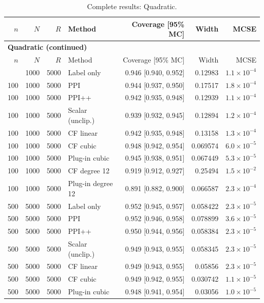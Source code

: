 {\setlength{\tabcolsep}{3pt}\begin{longtable}{rrrlrrr}
\caption{Complete results: Quadratic.}\\
\toprule $n$ & $N$ & $R$ & Method & Coverage [95\% MC] & Width & MCSE \\
\midrule\endfirsthead
\multicolumn{7}{l}{\textbf{Quadratic (continued)}}\\
\toprule $n$ & $N$ & $R$ & Method & Coverage [95\% MC] & Width & MCSE \\
\midrule\endhead
\bottomrule\endfoot
100 & 1000 & 5000 & Label only & 0.946 [0.940, 0.952] & 0.12983 & $1.1\times 10^{-4}$ \\
100 & 1000 & 5000 & PPI & 0.944 [0.937, 0.950] & 0.17517 & $1.8\times 10^{-4}$ \\
100 & 1000 & 5000 & PPI++ & 0.942 [0.935, 0.948] & 0.12939 & $1.1\times 10^{-4}$ \\
100 & 1000 & 5000 & Scalar (unclip.) & 0.939 [0.932, 0.945] & 0.12894 & $1.2\times 10^{-4}$ \\
100 & 1000 & 5000 & CF linear & 0.942 [0.935, 0.948] & 0.13158 & $1.3\times 10^{-4}$ \\
100 & 1000 & 5000 & CF cubic & 0.948 [0.942, 0.954] & 0.069574 & $6.0\times 10^{-5}$ \\
100 & 1000 & 5000 & Plug-in cubic & 0.945 [0.938, 0.951] & 0.067449 & $5.3\times 10^{-5}$ \\
100 & 1000 & 5000 & CF degree 12 & 0.919 [0.912, 0.927] & 0.25494 & $1.5\times 10^{-2}$ \\
100 & 1000 & 5000 & Plug-in degree 12 & 0.891 [0.882, 0.900] & 0.066587 & $2.3\times 10^{-4}$ \\
500 & 5000 & 5000 & Label only & 0.952 [0.945, 0.957] & 0.058422 & $2.3\times 10^{-5}$ \\
500 & 5000 & 5000 & PPI & 0.952 [0.946, 0.958] & 0.078899 & $3.6\times 10^{-5}$ \\
500 & 5000 & 5000 & PPI++ & 0.950 [0.944, 0.956] & 0.058384 & $2.3\times 10^{-5}$ \\
500 & 5000 & 5000 & Scalar (unclip.) & 0.949 [0.943, 0.955] & 0.058345 & $2.3\times 10^{-5}$ \\
500 & 5000 & 5000 & CF linear & 0.949 [0.943, 0.955] & 0.05856 & $2.3\times 10^{-5}$ \\
500 & 5000 & 5000 & CF cubic & 0.949 [0.942, 0.955] & 0.030742 & $1.1\times 10^{-5}$ \\
500 & 5000 & 5000 & Plug-in cubic & 0.948 [0.941, 0.954] & 0.03056 & $1.0\times 10^{-5}$ \\

\end{longtable}}

